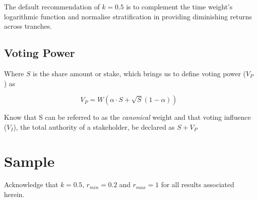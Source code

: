 \documentclass[a4paper,12pt]{article}
\begin{document}
The default recommendation of $k = 0.5$ is to complement the time weight's logarithmic function and normalise stratification in providing diminishing returns across tranches.

\subsection{\signifier Voting Power}

Where $S$ is the share amount or stake, which brings us to define voting power ($V_P$) as

\begin{equation}
    V_P = W(\alpha \cdot S + \sqrt{S}(1-\alpha))
\end{equation}

\vspace{10pt}

Know that S can be referred to as the \emph{canonical} weight and that voting influence ($V_I$), the total authority of a stakeholder, be declared as $S + V_P$

\section{\signifier Sample}

Acknowledge that $k = 0.5$, $r_{min} = 0.2$ and $r_{max} = 1$ for all results associated herein.
\end{document}

